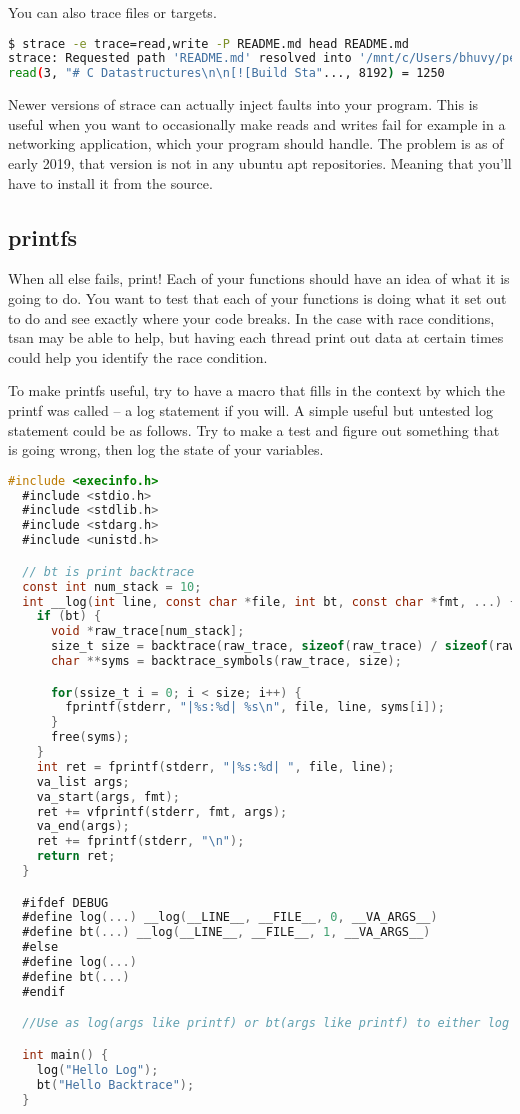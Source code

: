 You can also trace files or targets.

\begin{lstlisting}[language=bash]
$ strace -e trace=read,write -P README.md head README.md
strace: Requested path 'README.md' resolved into '/mnt/c/Users/bhuvy/personal/libds/README.md'
read(3, "# C Datastructures\n\n[![Build Sta"..., 8192) = 1250

\end{lstlisting}

Newer versions of strace can actually inject faults into your program.
This is useful when you want to occasionally make reads and writes fail for example in a networking application, which your program should handle.
The problem is as of early 2019, that version is not in any ubuntu apt repositories.
Meaning that you'll have to install it from the source.

\subsection{printfs}

When all else fails, print! Each of your functions should have an idea of what it is going to do.
You want to test that each of your functions is doing what it set out to do and see exactly where your code breaks.
In the case with race conditions, tsan may be able to help, but having each thread print out data at certain times could help you identify the race condition.

To make printfs useful, try to have a macro that fills in the context by which the printf was called -- a log statement if you will. A simple useful but untested log statement could be as follows.
Try to make a test and figure out something that is going wrong, then log the state of your variables.

\begin{lstlisting}[language=C]
  #include <execinfo.h>
  #include <stdio.h>
  #include <stdlib.h>
  #include <stdarg.h>
  #include <unistd.h>

  // bt is print backtrace
  const int num_stack = 10;
  int __log(int line, const char *file, int bt, const char *fmt, ...) {
    if (bt) {
      void *raw_trace[num_stack];
      size_t size = backtrace(raw_trace, sizeof(raw_trace) / sizeof(raw_trace[0]));
      char **syms = backtrace_symbols(raw_trace, size);

      for(ssize_t i = 0; i < size; i++) {
        fprintf(stderr, "|%s:%d| %s\n", file, line, syms[i]);
      }
      free(syms);
    }
    int ret = fprintf(stderr, "|%s:%d| ", file, line);
    va_list args;
    va_start(args, fmt);
    ret += vfprintf(stderr, fmt, args);
    va_end(args);
    ret += fprintf(stderr, "\n");
    return ret;
  }

  #ifdef DEBUG
  #define log(...) __log(__LINE__, __FILE__, 0, __VA_ARGS__)
  #define bt(...) __log(__LINE__, __FILE__, 1, __VA_ARGS__)
  #else
  #define log(...)
  #define bt(...)
  #endif

  //Use as log(args like printf) or bt(args like printf) to either log or get backtrace

  int main() {
    log("Hello Log");
    bt("Hello Backtrace");
  }
\end{lstlisting}

